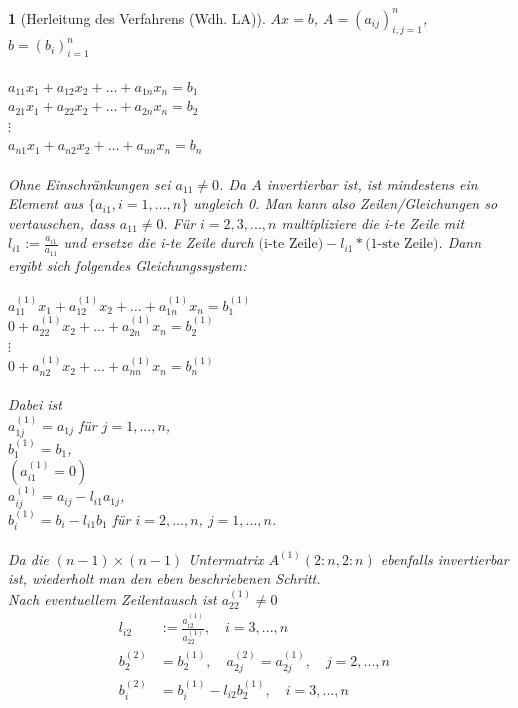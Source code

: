\documentclass[12pt]{article}
\theoremstyle{break}
\newtheorem{nothing}[theorem]{}
\begin{document}
\begin{nothing}[Herleitung des Verfahrens (Wdh. LA)]
$Ax = b$, $A = (a_{ij})_{i,j = 1}^n$, $b = (b_i)_{i=1}^n$\\\\
%
$a_{11} x_1 + a_{12}x_2 + \dots + a_{1n}x_n = b_1$\\
$a_{21} x_1 + a_{22}x_2 + \dots + a_{2n}x_n = b_2$\\
$\vdots$ \\
$a_{n1} x_1 + a_{n2}x_2 + \dots + a_{nn}x_n = b_n$\\\\
%
Ohne Einschränkungen sei $a_{11} \neq 0 $. Da $A$ invertierbar ist, ist mindestens ein Element aus $\{a_{i1}, i=1,...,n\}$ ungleich 0. Man kann also Zeilen/Gleichungen so vertauschen, dass $a_{11} \neq 0$. Für $i=2,3,...,n$ multipliziere die i-te Zeile mit $l_{i1} := \frac{a_{i1}}{a_{11}}$ und ersetze die i-te Zeile durch $\text{(i-te Zeile)} - l_{i1} * \text{(1-ste Zeile)}$. Dann ergibt sich folgendes Gleichungssystem: \\\\
%
$a_{11}^{(1)} x_1 + a_{12}^{(1)}x_2 + \dots + a_{1n}^{(1)}x_n = b_1^{(1)}$\\
$0 + a_{22}^{(1)}x_2 + \dots + a_{2n}^{(1)}x_n = b_2^{(1)}$\\
$\vdots$ \\
$0+ a_{n2}^{(1)}x_2 + \dots + a_{nn}^{(1)}x_n = b_n^{(1)}$\\\\
%
Dabei ist\\
$a_{1j}^{(1)} = a_{1j}$ für $j=1,...,n$, \\
$b_1^{(1)} = b_1$, \\
$(a_{i1}^{(1)} = 0)$\\
$a_{ij}^{(1)} = a_{ij} - l_{i1} a_{1j}$,\\
$b_i^{(1)} = b_i - l_{i1} b_1$ für $i=2,...,n$, $j=1,...,n$.\\\\
%
Da die $(n-1)\times (n-1)$ Untermatrix $A^{(1)} (2:n, 2:n)$ ebenfalls invertierbar ist, wiederholt man den eben beschriebenen Schritt.\\
Nach eventuellem Zeilentausch ist $a_{22}^{(1)} \neq 0$
%
\begin{align*}
l_{i2} &:= \frac{a_{i2}^{(1)}}{a_{22}^{(1)}}, \quad i=3,...,n &\\
b_2^{(2)} &= b_2^{(1)}, \quad a_{2j}^{(2)} = a_{2j}^{(1)}, \quad j=2,...,n &\\
b_i^{(2)} &= b_i^{(1)} - l_{i2} b_2^{(1)}, \quad i=3,...,n &\\

\end{align*}
\end{nothing}
\end{document}
